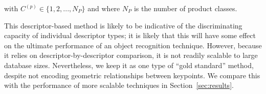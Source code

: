 \noindent with $C^{(p)} \in \lbrace 1, 2,..., N_P\rbrace $ and where $N_P$ is the number of product classes.

This descriptor-based method is likely to be indicative of the discriminating capacity of individual descriptor types; it is likely that this will have some effect on the ultimate performance of an object recognition technique. However, because it relies on descriptor-by-descriptor comparison, it is not readily scalable to large database sizes. Nevertheless, we keep it as one type of ``gold standard'' method, despite not encoding geometric relationships between keypoints. We compare this with the performance of more scalable techniques in Section~\ref{sec:results}.



%
%


